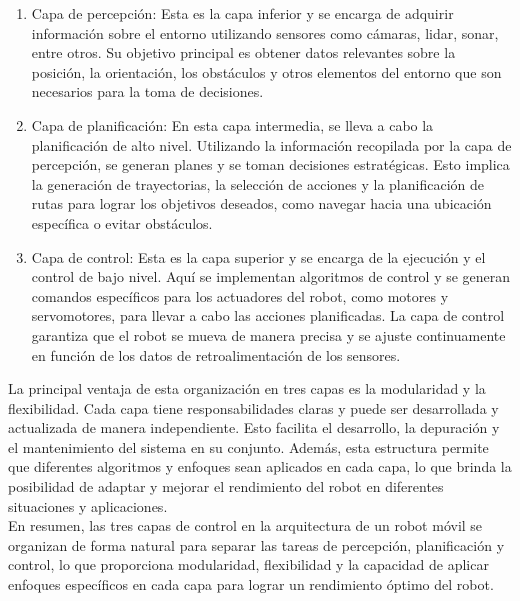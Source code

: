 \documentclass{article}
\begin{document}
\begin{itemize}
  \begin{enumerate}
  \item Capa de percepción: Esta es la capa inferior y se encarga de adquirir información sobre el entorno utilizando sensores como cámaras, lidar, sonar, entre otros. Su objetivo principal es obtener datos relevantes sobre la posición, la orientación, los obstáculos y otros elementos del entorno que son necesarios para la toma de decisiones.
  \item Capa de planificación: En esta capa intermedia, se lleva a cabo la planificación de alto nivel. Utilizando la información recopilada por la capa de percepción, se generan planes y se toman decisiones estratégicas. Esto implica la generación de trayectorias, la selección de acciones y la planificación de rutas para lograr los objetivos deseados, como navegar hacia una ubicación específica o evitar obstáculos.
  \item Capa de control: Esta es la capa superior y se encarga de la ejecución y el control de bajo nivel. Aquí se implementan algoritmos de control y se generan comandos específicos para los actuadores del robot, como motores y servomotores, para llevar a cabo las acciones planificadas. La capa de control garantiza que el robot se mueva de manera precisa y se ajuste continuamente en función de los datos de retroalimentación de los sensores.
  \end{enumerate}

  La principal ventaja de esta organización en tres capas es la modularidad y la flexibilidad. Cada capa tiene responsabilidades claras y puede ser desarrollada y actualizada de manera independiente. Esto facilita el desarrollo, la depuración y el mantenimiento del sistema en su conjunto. Además, esta estructura permite que diferentes algoritmos y enfoques sean aplicados en cada capa, lo que brinda la posibilidad de adaptar y mejorar el rendimiento del robot en diferentes situaciones y aplicaciones.\\
  

  En resumen, las tres capas de control en la arquitectura de un robot móvil se organizan de forma natural para separar las tareas de percepción, planificación y control, lo que proporciona modularidad, flexibilidad y la capacidad de aplicar enfoques específicos en cada capa para lograr un rendimiento óptimo del robot.
  
\end{itemize}
  
\end{document}
